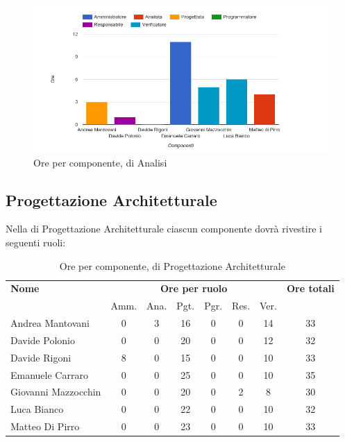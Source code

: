     \begin{figure}[H]
      \begin{center}
        \includegraphics[width=15cm]{res/img/suddivisioneRuoloProspettoOrario/orePerComponenteAnalisiMiglioramenti.png}
      \caption{Ore per componente,  di Analisi}
      \end{center} 
    \end{figure}    

\pagebreak
\subsection{Progettazione Architetturale}
Nella  di Progettazione Architetturale ciascun componente dovrà rivestire i seguenti ruoli:

\begin{table}[H]
\begin{tabular}{lccccccc}
\toprule
    \textbf{Nome}  & \multicolumn{6}{c}{\textbf{Ore per ruolo}} & \textbf{Ore totali} \\
     & Amm. & Ana. & Pgt. & Pgr. & Res. & Ver. & \\
    \midrule
    
	   Andrea Mantovani & 0 & 3 & 16 & 0 & 0 & 14 & 33 \\
	     Davide Polonio & 0 & 0 & 20 & 0 & 0 & 12 & 32 \\
	      Davide Rigoni & 8 & 0 & 15 & 0 & 0 & 10 & 33 \\
	   Emanuele Carraro & 0 & 0 & 25 & 0 & 0 & 10 & 35 \\
	Giovanni Mazzocchin & 0 & 0 & 20 & 0 & 2 & 8 & 30 \\
	        Luca Bianco & 0 & 0 & 22 & 0 & 0 & 10 & 32 \\
	    Matteo Di Pirro & 0 & 0 & 23 & 0 & 0 & 10 & 33 \\
    
    \bottomrule
\end{tabular}
\caption{Ore per componente,  di Progettazione Architetturale}
\end{table}

